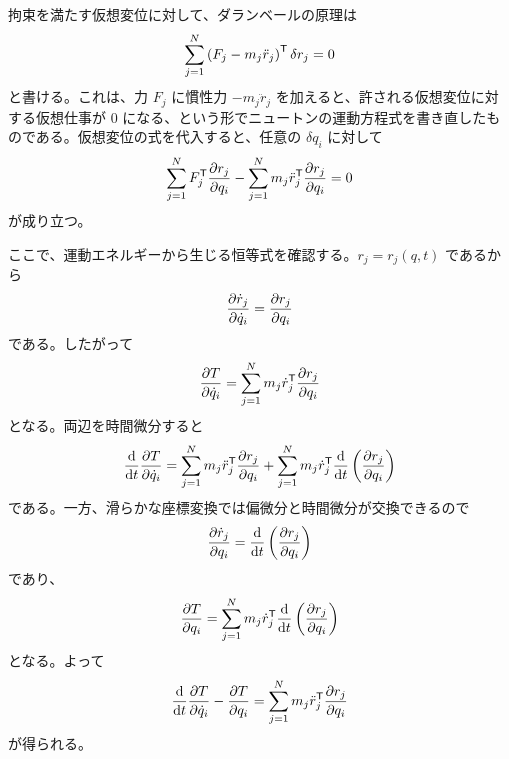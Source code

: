\begin{derivation}
拘束を満たす仮想変位に対して、ダランベールの原理は
\begin{equation}
  \sum_{j=1}^N
  \left(F_j-m_j\ddot{r}_j\right)^{\mathsf{T}}\delta r_j=0
\end{equation}
と書ける。これは、力 $F_j$ に慣性力 $-m_j\ddot{r}_j$ を加えると、許される仮想変位に対する仮想仕事が 0 になる、という形でニュートンの運動方程式を書き直したものである。仮想変位の式を代入すると、任意の $\delta q_i$ に対して
\begin{equation}
  \sum_{j=1}^N
  F_j^{\mathsf{T}}\frac{\partial r_j}{\partial q_i}
  -
  \sum_{j=1}^N
  m_j\ddot{r}_j^{\mathsf{T}}\frac{\partial r_j}{\partial q_i}
  =0
\end{equation}
が成り立つ。

ここで、運動エネルギーから生じる恒等式を確認する。$r_j=r_j(q,t)$ であるから
\begin{equation}
  \frac{\partial \dot{r}_j}{\partial \dot{q}_i}
  =
  \frac{\partial r_j}{\partial q_i}
\end{equation}
である。したがって
\begin{equation}
  \frac{\partial T}{\partial \dot{q}_i}
  =
  \sum_{j=1}^N
  m_j\dot{r}_j^{\mathsf{T}}
  \frac{\partial r_j}{\partial q_i}
\end{equation}
となる。両辺を時間微分すると
\begin{equation}
  \frac{\mathrm{d}}{\mathrm{d} t}
  \frac{\partial T}{\partial \dot{q}_i}
  =
  \sum_{j=1}^N
  m_j\ddot{r}_j^{\mathsf{T}}
  \frac{\partial r_j}{\partial q_i}
  +
  \sum_{j=1}^N
  m_j\dot{r}_j^{\mathsf{T}}
  \frac{\mathrm{d}}{\mathrm{d} t}
  \left(
    \frac{\partial r_j}{\partial q_i}
  \right)
\end{equation}
である。一方、滑らかな座標変換では偏微分と時間微分が交換できるので
\begin{equation}
  \frac{\partial \dot{r}_j}{\partial q_i}
  =
  \frac{\mathrm{d}}{\mathrm{d} t}
  \left(
    \frac{\partial r_j}{\partial q_i}
  \right)
\end{equation}
であり、
\begin{equation}
  \frac{\partial T}{\partial q_i}
  =
  \sum_{j=1}^N
  m_j\dot{r}_j^{\mathsf{T}}
  \frac{\mathrm{d}}{\mathrm{d} t}
  \left(
    \frac{\partial r_j}{\partial q_i}
  \right)
\end{equation}
となる。よって
\begin{equation}
  \frac{\mathrm{d}}{\mathrm{d} t}
  \frac{\partial T}{\partial \dot{q}_i}
  -
  \frac{\partial T}{\partial q_i}
  =
  \sum_{j=1}^N
  m_j\ddot{r}_j^{\mathsf{T}}
  \frac{\partial r_j}{\partial q_i}
\end{equation}
が得られる。


\end{derivation}

